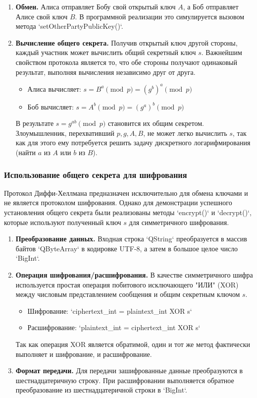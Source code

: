 \begin{enumerate}
    \item \textbf{Обмен.} Алиса отправляет Бобу свой открытый ключ $A$, а Боб отправляет Алисе свой ключ $B$. В программной реализации это симулируется вызовом метода `setOtherPartyPublicKey()`.

    \item \textbf{Вычисление общего секрета.} Получив открытый ключ другой стороны, каждый участник может вычислить общий секретный ключ $s$. Важнейшим свойством протокола является то, что обе стороны получают одинаковый результат, выполняя вычисления независимо друг от друга.
    \begin{itemize}
        \item Алиса вычисляет: $s = B^a \pmod{p} = (g^b)^a \pmod{p}$
        \item Боб вычисляет: $s = A^b \pmod{p} = (g^a)^b \pmod{p}$
    \end{itemize}
    В результате $s = g^{ab} \pmod{p}$ становится их общим секретом. Злоумышленник, перехвативший $p, g, A, B$, не может легко вычислить $s$, так как для этого ему потребуется решить задачу дискретного логарифмирования (найти $a$ из $A$ или $b$ из $B$).
\end{enumerate}



\subsubsection{Использование общего секрета для шифрования}
Протокол Диффи-Хеллмана предназначен исключительно для обмена ключами и не является протоколом шифрования. Однако для демонстрации успешного установления общего секрета были реализованы методы `encrypt()` и `decrypt()`, которые используют полученный ключ $s$ для симметричного шифрования.

\begin{enumerate}
    \item \textbf{Преобразование данных.} Входная строка `QString` преобразуется в массив байтов `QByteArray` в кодировке UTF-8, а затем в большое целое число `BigInt`.
    
    \item \textbf{Операция шифрования/расшифрования.} В качестве симметричного шифра используется простая операция побитового исключающего "ИЛИ" (XOR) между числовым представлением сообщения и общим секретным ключом $s$.
    \begin{itemize}
        \item Шифрование: `ciphertext\_int = plaintext\_int XOR s`
        \item Расшифрование: `plaintext\_int = ciphertext\_int XOR s`
    \end{itemize}
    Так как операция XOR является обратимой, один и тот же метод фактически выполняет и шифрование, и расшифрование.

    \item \textbf{Формат передачи.} Для передачи зашифрованные данные преобразуются в шестнадцатеричную строку. При расшифровании выполняется обратное преобразование из шестнадцатеричной строки в `BigInt`.
\end{enumerate}

